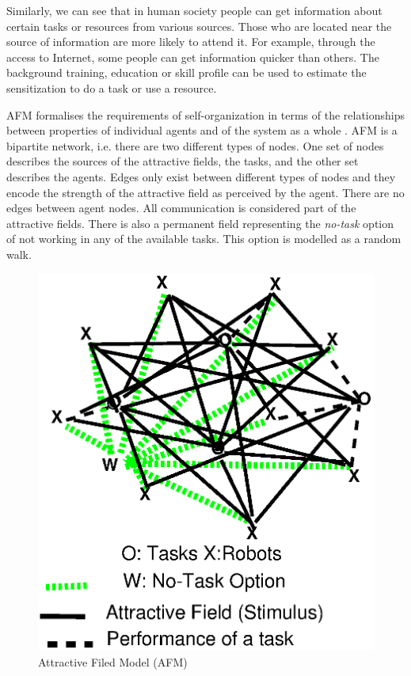 \documentclass[smallcondensed]{svjour3}
\begin{document}
Similarly, we can see that in human society people can get information about certain tasks or resources from various sources. Those who are located near the source of information are more likely to attend it. For example, through the access to Internet, some people can get information quicker than others.  The background training, education or skill profile can be used to estimate the sensitization to do a task or use a resource. 

AFM formalises the requirements of self-organization in terms of the relationships between properties of individual agents and of the system as a whole \citep{Arcaute+2008}.  AFM is a bipartite network, i.e. there are two different types of nodes.  One set of nodes describes the sources of the attractive fields, the tasks, and the other set describes the agents.  Edges only exist between different types of nodes and they encode the strength of the attractive field as perceived by the agent.  There are no edges between agent nodes.  All communication is considered part of the attractive fields.  There is also a permanent field representing the {\em no-task} option of not working in any of the available tasks.  This option is modelled as a random walk.  
\begin{figure}[htp]
\centering
\includegraphics[height=0.5\textwidth, angle=0]{./images/AFM-Diag3.eps}
\caption{\small Attractive Filed Model (AFM)}
\label{fig:afm} %
\end{figure}
\end{document}

